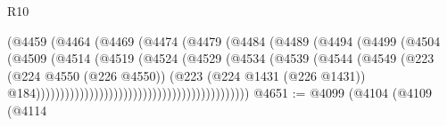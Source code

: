 \begin{lexlean}{R10}
\begin{coremodule}
                                                  (@4459
                                                    (@4464
                                                      (@4469
                                                        (@4474
                                                          (@4479
                                                            (@4484
                                                              (@4489
                                                                (@4494
                                                                  (@4499
                                                                    (@4504
                                                                      (@4509
                                                                        (@4514
                                                                          (@4519
                                                                            (@4524
                                                                              (@4529
                                                                                (@4534
                                                                                  (@4539
                                                                                    (@4544
                                                                                      (@4549
                                                                                        (@223
                                                                                          (@224
                                                                                            @4550
                                                                                            (@226
                                                                                              @4550))
                                                                                          (@223
                                                                                            (@224
                                                                                              @1431
                                                                                              (@226
                                                                                                @1431))
                                                                                            @184))))))))))))))))))))))))))))))))))))))))))))
@4651 := @4099
    (@4104
      (@4109
        (@4114

\end{coremodule}
\end{lexlean}
